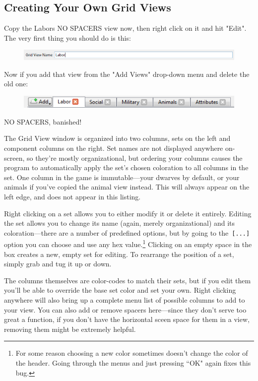 \documentclass[]{article}
\begin{document}
\newpage
\subsection{Creating Your Own Grid Views}
\label{sec:Creating Your Own Grid Views}

Copy the Labors NO SPACERS view now, then right click on it and hit "Edit". The very first thing you
should do is this:
\begin{figure}[h!]
\centering
\includegraphics[width=\linewidth]{Sec3Fig15}
\end{figure}

Now if you add that view from the "Add Views" drop-down menu and delete the old one:
\begin{figure}[h!]
\centering
\includegraphics{Sec3Fig16}
\end{figure}

NO SPACERS, banished!

The Grid View window is organized into two columns, sets on the left and
component columns on the right. Set names are not displayed anywhere on-screen, so they're mostly
organizational, but ordering your columns causes the program to automatically apply the set's chosen
coloration to all columns in the set. One column in the game is immutable---your dwarves by default, or
your animals if you've copied the animal view instead. This will always appear on the left edge, and does
not appear in this listing.

Right clicking on a set allows you to either modify it or delete it entirely. Editing the set allows you
to change its name (again, merely organizational) and its coloration---there are a number of predefined
options, but by going to the\texttt{ [...]} option you can choose and use any hex value.\footnote{For
some reason choosing a new color sometimes doesn't change the color of the header. Going through the
menus and just pressing ``OK" again fixes this bug.} Clicking on an empty space in the box creates a new,
empty set for editing. To rearrange the position of a set, simply grab and tug it up or down.

The columns themselves are color-codes to match their sets, but if you edit them you'll be able to
override the base set color and set your own. Right clicking anywhere will also bring up a complete
menu list of possible columns to add to your view. You can also add or remove spacers here---since they
don't serve too great a function, if you don't have the horizontal sceen space for them in a view,
removing them might be extremely helpful.
\end{document}
